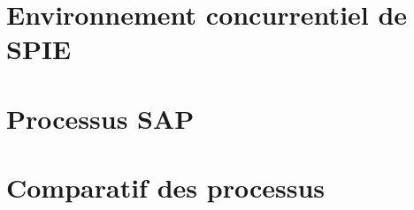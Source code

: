 

\newcommand{\mainTitle}{\'Etude préalable - SPIE}
\newcommand{\secondTitle}{Benchmarking}
\newcommand{\documentRef}{DEB-B/4401/1}





\tableofcontents
\listoffigures
\newpage

\part{Environnement concurrentiel de SPIE}
\setcounter{section}{0}


\part{Processus SAP}
\setcounter{section}{0}


\part{Comparatif des processus}
\setcounter{section}{0}




